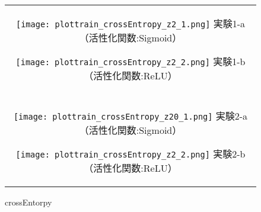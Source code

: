 \documentclass[12pt]{jsarticle}
\begin{document}
\begin{figure}[ht]
  \begin{center}
    \begin{tabular}{c}

      \begin{minipage}{0.5\hsize}
        \begin{center}
          \texttt{[image: plottrain\_crossEntropy\_z2\_1.png]}
          \hspace{0.2cm} 実験1-a　（活性化関数:Sigmoid）
        \end{center}
      \end{minipage}

      \begin{minipage}{0.5\hsize}
        \begin{center}
          \texttt{[image: plottrain\_crossEntropy\_z2\_2.png]}
          \hspace{0.2cm} 実験1-b　（活性化関数:ReLU）
        \end{center}
      \end{minipage}\\\\

      \begin{minipage}{0.5\hsize}
        \begin{center}
          \texttt{[image: plottrain\_crossEntropy\_z20\_1.png]}
          \hspace{0.2cm} 実験2-a　（活性化関数:Sigmoid）
        \end{center}
      \end{minipage}

      \begin{minipage}{0.5\hsize}
        \begin{center}
          \texttt{[image: plottrain\_crossEntropy\_z2\_2.png]}
          \hspace{0.2cm} 実験2-b　（活性化関数:ReLU）
        \end{center}
      \end{minipage}

    \end{tabular}
    \caption{crossEntorpy}
     \label{fig:crossEntorpy2}
  \end{center}
\end{figure}
\end{document}
